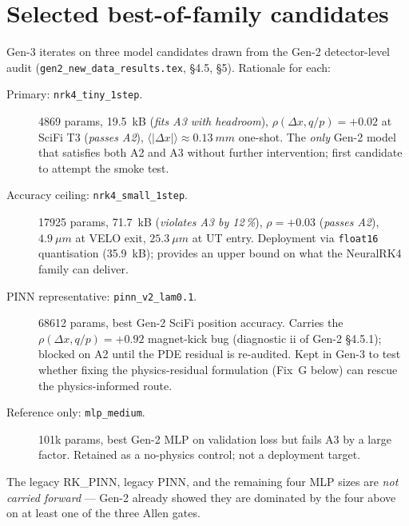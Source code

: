 \documentclass[a4paper,11pt]{article}
\newcommand{\SI}[2]{#1~#2}
\newcommand{\num}[1]{#1}
\newcommand{\kilo}{k}
\newcommand{\byte}{B}
\newcommand{\mm}{mm}
\begin{document}
\section{Selected best-of-family candidates}\label{gen3:sec:candidates}

Gen-3 iterates on three model candidates drawn from the Gen-2
detector-level audit (\texttt{gen2\_new\_data\_results.tex}, §4.5, §5).
Rationale for each:

\begin{description}
\item[Primary: \texttt{nrk4\_tiny\_1step}.]  \num{4869} params,
      \SI{19.5}{\kilo\byte} (\emph{fits A3 with headroom}),
      $\rho(\Delta x,q/p)=+0.02$ at SciFi T3 (\emph{passes A2}),
      $\langle|\Delta x|\rangle \approx \SI{0.13}{\mm}$ one-shot.
      The \emph{only} Gen-2 model that satisfies both A2 and A3
      without further intervention; first candidate to attempt the
      smoke test.
\item[Accuracy ceiling: \texttt{nrk4\_small\_1step}.]  \num{17925}
      params, \SI{71.7}{\kilo\byte} (\emph{violates A3 by 12\,\%}),
      $\rho=+0.03$ (\emph{passes A2}), $\SI{4.9}{\mu m}$ at VELO exit,
      $\SI{25.3}{\mu m}$ at UT entry.  Deployment via
      \texttt{float16} quantisation (\SI{35.9}{\kilo\byte}); provides
      an upper bound on what the NeuralRK4 family can deliver.
\item[PINN representative: \texttt{pinn\_v2\_lam0.1}.]  \num{68612}
      params, best Gen-2 SciFi position accuracy.  Carries the
      $\rho(\Delta x,q/p)=+0.92$ magnet-kick bug
      (diagnostic ii of Gen-2 §4.5.1); blocked on A2 until the PDE
      residual is re-audited.  Kept in Gen-3 to test whether fixing
      the physics-residual formulation (Fix~G below) can rescue the
      physics-informed route.
\item[Reference only: \texttt{mlp\_medium}.]  \num{101k} params,
      best Gen-2 MLP on validation loss but fails A3 by a large
      factor.  Retained as a no-physics control; not a deployment
      target.
\end{description}

The legacy RK\_PINN, legacy PINN, and the remaining four MLP sizes are
\emph{not carried forward} --- Gen-2 already showed they are
dominated by the four above on at least one of the three Allen gates.

\end{document}
